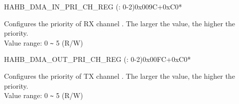 \begin{register}{H}{AHB\_DMA\_IN\_PRI\_CH\_REG (: 0-2)}{0x009C+0xC0*}\label{regdesc:AHBDMAINPRICHNREG}
%
%
\regnewline%
\begin{regdesc}\begin{reglist}
\label{fielddesc:AHBDMARXPRICHN}\item [AHB\_DMA\_RX\_PRI\_CH\regindex{n}] Configures the priority of RX channel . The larger the value, the higher the priority. \\
Value range: 0  \verb+~+  5 (R/W)
\end{reglist}\end{regdesc}
\end{register}


\begin{register}{H}{AHB\_DMA\_OUT\_PRI\_CH\_REG (: 0-2)}{0x00FC+0xC0*}\label{regdesc:AHBDMAOUTPRICHNREG}
%
%
\regnewline%
\begin{regdesc}\begin{reglist}
\label{fielddesc:AHBDMATXPRICHN}\item [AHB\_DMA\_TX\_PRI\_CH\regindex{n}] Configures the priority of TX channel . The larger the value, the higher the priority. \\
Value range: 0  \verb+~+  5 (R/W)
\end{reglist}\end{regdesc}
\end{register}


